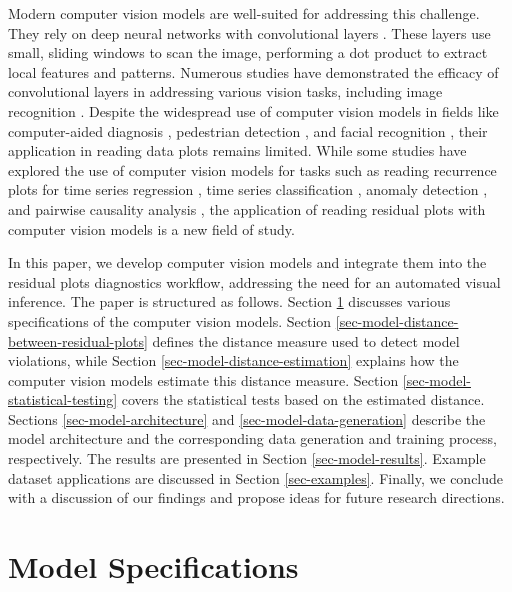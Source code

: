 \documentclass[]{interact}
\theoremstyle{plain}%
\theoremstyle{definition}
\theoremstyle{remark}
\begin{document}
Modern computer vision models are well-suited for addressing this
challenge. They rely on deep neural networks with convolutional layers
\citep{fukushima1982neocognitron}. These layers use small, sliding
windows to scan the image, performing a dot product to extract local
features and patterns. Numerous studies have demonstrated the efficacy
of convolutional layers in addressing various vision tasks, including
image recognition \citep{rawat2017deep}. Despite the widespread use of
computer vision models in fields like computer-aided diagnosis
\citep{lee2015image}, pedestrian detection \citep{brunetti2018computer},
and facial recognition \citep{emami2012facial}, their application in
reading data plots remains limited. While some studies have explored the
use of computer vision models for tasks such as reading recurrence plots
for time series regression \citep{ojeda2020multivariate}, time series
classification
\citep{chu2019automatic, hailesilassie2019financial, hatami2018classification, zhang2020encoding},
anomaly detection \citep{chen2020convolutional}, and pairwise causality
analysis \citep{singh2017deep}, the application of reading residual
plots with computer vision models is a new field of study.

In this paper, we develop computer vision models and integrate them into
the residual plots diagnostics workflow, addressing the need for an
automated visual inference. The paper is structured as follows. Section
\ref{sec-model-specifications} discusses various specifications of the
computer vision models. Section
\ref{sec-model-distance-between-residual-plots} defines the distance
measure used to detect model violations, while Section
\ref{sec-model-distance-estimation} explains how the computer vision
models estimate this distance measure. Section
\ref{sec-model-statistical-testing} covers the statistical tests based
on the estimated distance. Sections \ref{sec-model-architecture} and
\ref{sec-model-data-generation} describe the model architecture and the
corresponding data generation and training process, respectively. The
results are presented in Section \ref{sec-model-results}. Example
dataset applications are discussed in Section \ref{sec-examples}.
Finally, we conclude with a discussion of our findings and propose ideas
for future research directions.

\section{Model Specifications}\label{sec-model-specifications}
\end{document}
